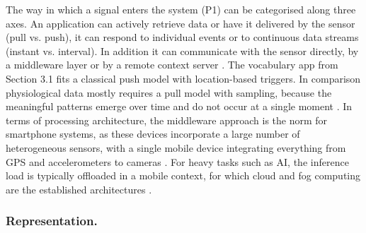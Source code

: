 \documentclass[runningheads]{llncs}
\begin{document}
The way in which a signal enters the system (P1) can be categorised along three axes. An application can actively retrieve data or have it delivered by the sensor (pull vs. push), it can respond to individual events or to continuous data streams (instant vs. interval). In addition it can communicate with the sensor directly, by a middleware layer or by a remote context server \cite{perera_context_2014}.
The vocabulary app from Section 3.1 fits a classical push model with location-based triggers.
In comparison physiological data mostly requires a pull model with sampling, because the meaningful patterns emerge over time and do not occur at a single moment \cite{hong_advances_2025}.
In terms of processing architecture, the middleware approach is the norm for smartphone systems, as these devices incorporate a large number of heterogeneous sensors, with a single mobile device integrating everything from GPS and accelerometers to cameras \cite{perera_context_2014}.
For heavy tasks such as AI, the inference load is typically offloaded in a mobile context, for which cloud and fog computing are the established architectures \cite{gumbheer_personalized_2022}.




\subsubsection{Representation.}
\end{document}

